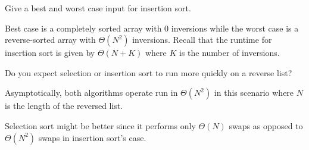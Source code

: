 \question Give a best and worst case input for insertion sort.

\begin{solution}[0.5in]
Best case is a completely sorted array with 0 inversions while the worst case
is a reverse-sorted array with $\Theta(N^2)$ inversions. Recall that the
runtime for insertion sort is given by $\Theta(N + K)$ where $K$ is the number
of inversions.
\end{solution}

\question Do you expect selection or insertion sort to run more quickly on a
reverse list?

\begin{solution}[0.5in]
Asymptotically, both algorithms operate run in $\Theta(N^2)$ in this scenario
where $N$ is the length of the reversed list.

Selection sort might be better since it performs only $\Theta(N)$ swaps as
opposed to $\Theta(N^2)$ swaps in insertion sort's case.
\end{solution}